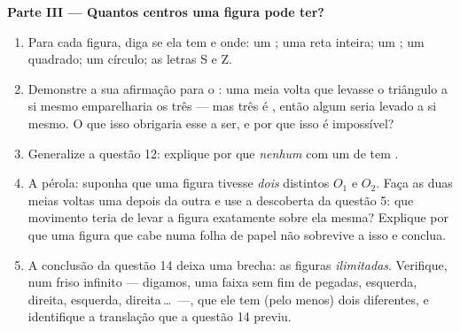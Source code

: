 \begin{problem}
\medskip
\noindent\textbf{Parte III --- Quantos centros uma figura pode ter?}
\begin{enumerate}[resume]
  \item Para cada figura, diga se ela tem  e onde: um
        ; uma reta inteira; um ; um
        quadrado; um círculo; as letras S e Z.
  \item Demonstre a sua afirmação para o : uma meia
        volta que levasse o triângulo a si mesmo emparelharia os três
         --- mas três é , então algum  seria levado
        a si mesmo. O que isso obrigaria esse  a ser, e por que
        isso é impossível?
  \item Generalize a questão 12: explique por que \emph{nenhum}
         com um  de  tem .
  \item A pérola: suponha que uma figura tivesse \emph{dois}  distintos $O_1$ e $O_2$. Faça as duas meias voltas uma
        depois da outra e use a descoberta da questão 5: que movimento
        teria de levar a figura exatamente sobre ela mesma? Explique
        por que uma figura que cabe numa folha de papel não sobrevive a
        isso e conclua.
  \item A conclusão da questão 14 deixa uma brecha: as figuras
        \emph{ilimitadas}. Verifique, num friso infinito --- digamos,
        uma faixa sem fim de pegadas, esquerda, direita, esquerda,
        direita\,\dots\ ---, que ele tem (pelo menos) dois  diferentes, e identifique a translação que a questão
        14 previu.
\end{enumerate}
\end{problem}
